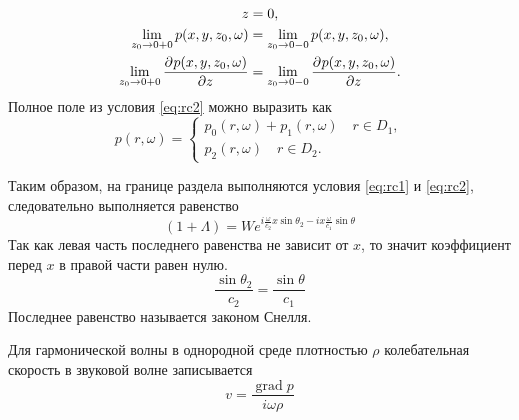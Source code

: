 \documentclass[a4paper, fontsize=14pt]{article}
\newcommand{\gradop}{\operatorname{grad}}
\begin{document}
	\begin{gather}
		z=0,\label{eq:rc1}\\
		\lim_{z_0\to 0+0} p(x,y,z_0,\omega) = \lim_{z_0\to 0-0} p(x,y,z_0,\omega), \label{eq:rc2}\\
		\lim_{z_0\to 0+0} \frac{\partial ^ {  } p(x,y,z_0,\omega)}{\partial z ^ {  } } = \lim_{z_0\to 0-0} \frac{\partial ^ {  } p(x,y,z_0,\omega)}{\partial z ^ {  } }.\label{eq:rc3}
	\end{gather}
	Полное поле из условия \eqref{eq:rc2} можно выразить как 
	\begin{equation}
		p(r,\omega) = \begin{cases}
			p_0(r,\omega)+p_1(r,\omega) \quad r\in D_1, \\
			p_2(r,\omega) \quad r \in D_2.
		\end{cases}
	\end{equation}
	
	Таким образом, на границе раздела выполняются условия \eqref{eq:rc1} и \eqref{eq:rc2}, следовательно выполняется равенство
	\begin{equation}
		(1+\Lambda)= W e^{i\frac{\omega}{c_2}x\sin \theta_2  - ix\frac{\omega}{c_1}\sin \theta}
	\end{equation}
	Так как левая часть последнего равенства не зависит от $x$, то значит  коэффициент перед  $x$ в правой части равен нулю.
	\begin{equation}
		\frac{\sin \theta_2}{c_2} = \frac{\sin \theta}{c_1} 
	\label{eq:snell}
	\end{equation}
	Последнее равенство называется законом Снелля.
	
	Для гармонической волны в однородной среде плотностью $\rho$ колебательная скорость в звуковой волне записывается \cite{landavshic}
	\begin{equation}
		v = \frac{\gradop p}{i\omega \rho}
	\end{equation}
	
\end{document}
